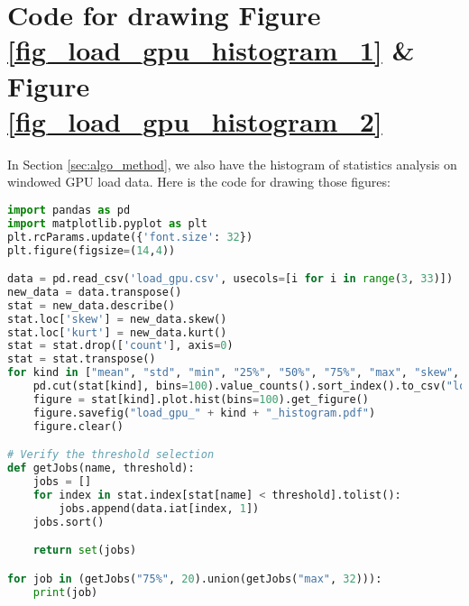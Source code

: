 \chapter{Code for drawing Figure \ref{fig_load_gpu_histogram_1} \& Figure \ref{fig_load_gpu_histogram_2}}
In Section \ref{sec:algo_method}, we also have the histogram of statistics analysis on windowed GPU load data. Here is the code for drawing those figures:

\begin{lstlisting}[language=Python]
import pandas as pd
import matplotlib.pyplot as plt
plt.rcParams.update({'font.size': 32})
plt.figure(figsize=(14,4))

data = pd.read_csv('load_gpu.csv', usecols=[i for i in range(3, 33)])
new_data = data.transpose()
stat = new_data.describe()
stat.loc['skew'] = new_data.skew()
stat.loc['kurt'] = new_data.kurt()
stat = stat.drop(['count'], axis=0)
stat = stat.transpose()
for kind in ["mean", "std", "min", "25%", "50%", "75%", "max", "skew", "kurt"]:
    pd.cut(stat[kind], bins=100).value_counts().sort_index().to_csv("load_gpu_" + kind + "_histogram.csv")
    figure = stat[kind].plot.hist(bins=100).get_figure()
    figure.savefig("load_gpu_" + kind + "_histogram.pdf")
    figure.clear()

# Verify the threshold selection
def getJobs(name, threshold):
    jobs = []
    for index in stat.index[stat[name] < threshold].tolist():
        jobs.append(data.iat[index, 1])
    jobs.sort()

    return set(jobs)

for job in (getJobs("75%", 20).union(getJobs("max", 32))):
    print(job)
\end{lstlisting}
